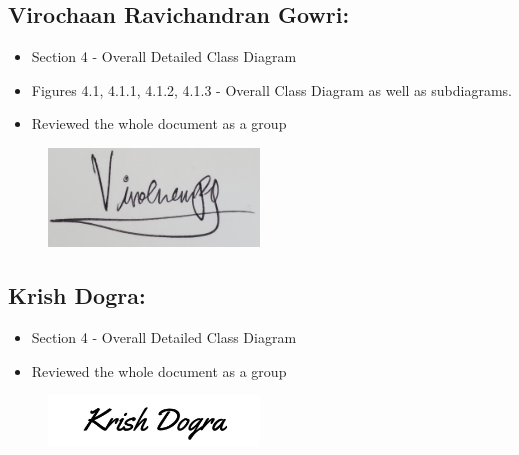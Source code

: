 \documentclass[]{article}
\begin{document}
\subsection*{Virochaan Ravichandran Gowri:}
\begin{itemize}
	\item Section 4 - Overall Detailed Class Diagram
	\item Figures 4.1, 4.1.1, 4.1.2, 4.1.3 - Overall Class Diagram as well as subdiagrams.
	\item Reviewed the whole document as a group
\end{itemize}
\begin{figure}[h]
	\centering
	\includegraphics[width=0.5\textwidth]{../images/ViroSignature.jpg}
	\label{fig:signature}
\end{figure}
\subsection*{Krish Dogra:}
\begin{itemize}
	\item Section 4 - Overall Detailed Class Diagram
	\item Reviewed the whole document as a group
\end{itemize}
\begin{figure}[h]
	\centering
	\includegraphics[width=0.5\textwidth]{../images/KrishSignature.jpg}
	\label{fig:signature}
\end{figure}

\newpage
\end{document}
